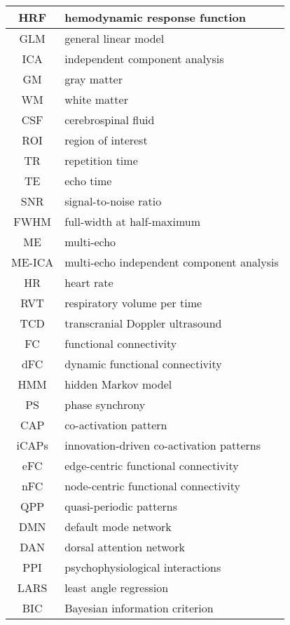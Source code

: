 \begin{table}[h]
\begin{tabular}{|c|p{}|}
    \hline
    HRF & hemodynamic response function \\
    \hline
    GLM & general linear model \\
    \hline
    ICA & independent component analysis \\
    \hline
    GM & gray matter \\
    \hline
    WM & white matter \\
    \hline
    CSF & cerebrospinal fluid \\
    \hline
    ROI & region of interest \\
    \hline
    TR & repetition time \\
    \hline
    TE & echo time \\
    \hline
    SNR & signal-to-noise ratio \\
    \hline
    FWHM & full-width at half-maximum \\
    \hline
    ME & multi-echo \\
    \hline
    ME-ICA & multi-echo independent component analysis \\
    \hline
    HR & heart rate \\
    \hline
    RVT & respiratory volume per time \\
    \hline
    TCD & transcranial Doppler ultrasound \\
    \hline
    FC & functional connectivity \\
    \hline
    dFC & dynamic functional connectivity \\
    \hline
    HMM & hidden Markov model \\
    \hline
    PS & phase synchrony \\
    \hline
    CAP & co-activation pattern \\
    \hline
    iCAPs & innovation-driven co-activation patterns \\
    \hline
    eFC & edge-centric functional connectivity \\
    \hline
    nFC & node-centric functional connectivity \\
    \hline
    QPP & quasi-periodic patterns \\
    \hline
    DMN & default mode network \\
    \hline
    DAN & dorsal attention network \\
    \hline
    PPI & psychophysiological interactions \\
    \hline
    LARS & least angle regression \\
    \hline
    BIC & Bayesian information criterion \\

\end{tabular}
\end{table}
